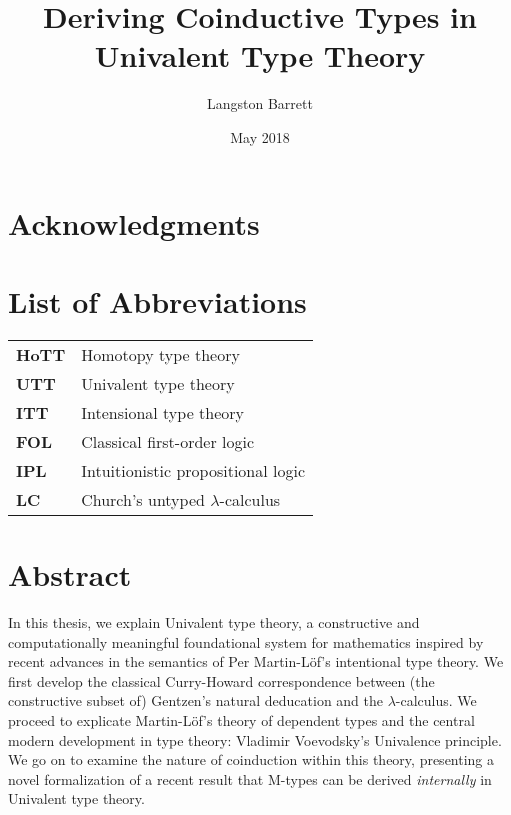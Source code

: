 \documentclass[12pt,twoside,draft]{reedthesis}
\title{Deriving Coinductive Types in Univalent Type Theory}
\author{Langston Barrett}
\date{May 2018}
\begin{document}
\maketitle
\frontmatter %
\pagestyle{empty} %

\chapter*{Acknowledgments}


\chapter*{List of Abbreviations}

\begin{table}[h]
  \centering
  \begin{tabular}{ll}
    \textbf{HoTT}  	&  Homotopy type theory \\
    \textbf{UTT}  	&  Univalent type theory \\
    \textbf{ITT}  	&  Intensional type theory \\
    \textbf{FOL}  	&  Classical first-order logic \\
    \textbf{IPL}  	&  Intuitionistic propositional logic \\
    \textbf{LC}  	  &  Church's untyped $\lambda$-calculus
  \end{tabular}
\end{table}
	
\setcounter{tocdepth}{4}
\tableofcontents

\chapter*{Abstract}

In this thesis, we explain Univalent type theory, a constructive and
computationally meaningful foundational system for mathematics inspired by
recent advances in the semantics of Per Martin-L\"of's intentional type theory.
We first develop the classical Curry-Howard correspondence between (the
constructive subset of) Gentzen's natural deducation and the $\lambda$-calculus.
We proceed to explicate Martin-L\"of's theory of dependent types and the central
modern development in type theory: Vladimir Voevodsky's Univalence principle. 
We go on to examine the nature of coinduction within this theory, presenting a
novel formalization of a recent result that M-types can be derived
\textit{internally} in Univalent type theory.
\end{document}
